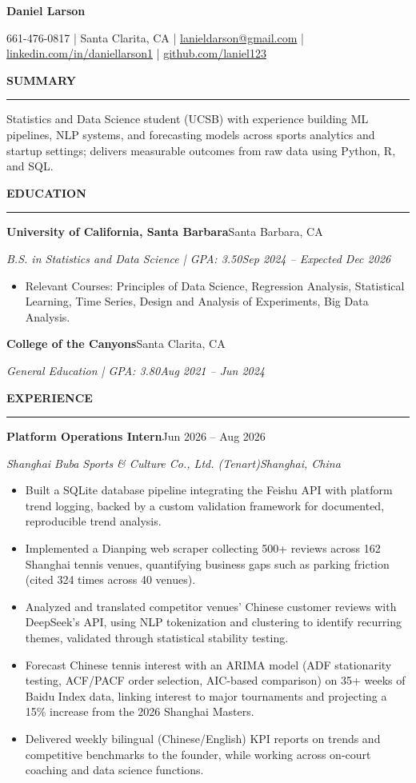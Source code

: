 \documentclass[letterpaper,10pt]{article}
\newcommand{\resumeSection}[1]{%
  \vspace{3pt}%
  {\large\bfseries #1}\par
  \vspace{-4pt}\rule{\linewidth}{0.4pt}\par
  \vspace{1pt}%
}
\newcommand{\entry}[4]{%
  \textbf{#1}\hfill #2\par
  \textit{#3}\hfill \textit{#4}\par
}
\newenvironment{bullets}{\begin{itemize}}{\end{itemize}\vspace{1pt}}
\begin{document}
\begin{center}
  {\LARGE\bfseries Daniel Larson}\par
  \vspace{3pt}
  661-476-0817 | Santa Clarita, CA | \href{mailto:lanieldarson@gmail.com}{lanieldarson@gmail.com} |
  \href{https://www.linkedin.com/in/daniellarson1}{linkedin.com/in/daniellarson1} |
  \href{https://github.com/laniel123}{github.com/laniel123}
\end{center}

\resumeSection{SUMMARY}
Statistics and Data Science student (UCSB) with experience building ML pipelines, NLP systems, and forecasting models across sports analytics and startup settings; delivers measurable outcomes from raw data using Python, R, and SQL.

\resumeSection{EDUCATION}
\entry{University of California, Santa Barbara}{Santa Barbara, CA}
      {B.S. in Statistics and Data Science | GPA: 3.50}{Sep 2024 -- Expected Dec 2026}
\begin{bullets}
  \item Relevant Courses: Principles of Data Science, Regression Analysis, Statistical Learning, Time Series, Design and Analysis of Experiments, Big Data Analysis.
\end{bullets}
\entry{College of the Canyons}{Santa Clarita, CA}
      {General Education | GPA: 3.80}{Aug 2021 -- Jun 2024}

\resumeSection{EXPERIENCE}
\entry{Platform Operations Intern}{Jun 2026 -- Aug 2026}
      {Shanghai Buba Sports \& Culture Co., Ltd. (Tenart)}{Shanghai, China}
\begin{bullets}
  \item Built a SQLite database pipeline integrating the Feishu API with platform trend logging, backed by a custom validation framework for documented, reproducible trend analysis.
  \item Implemented a Dianping web scraper collecting 500+ reviews across 162 Shanghai tennis venues, quantifying business gaps such as parking friction (cited 324 times across 40 venues).
  \item Analyzed and translated competitor venues' Chinese customer reviews with DeepSeek's API, using NLP tokenization and clustering to identify recurring themes, validated through statistical stability testing.
  \item Forecast Chinese tennis interest with an ARIMA model (ADF stationarity testing, ACF/PACF order selection, AIC-based comparison) on 35+ weeks of Baidu Index data, linking interest to major tournaments and projecting a 15\% increase from the 2026 Shanghai Masters.
  \item Delivered weekly bilingual (Chinese/English) KPI reports on trends and competitive benchmarks to the founder, while working across on-court coaching and data science functions.
\end{bullets}
\end{document}
